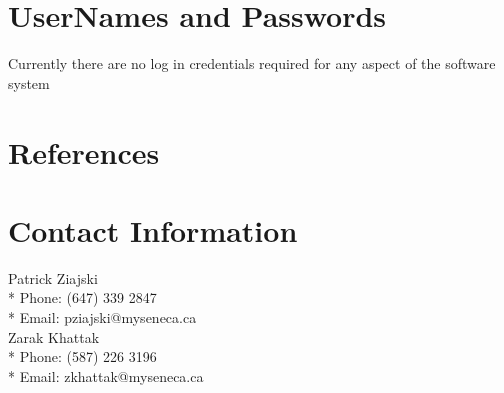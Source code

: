 \documentclass[a4paper,12pt]{article}
\begin{document}
\newpage
\section{UserNames and Passwords}
Currently there are no log in credentials required for any aspect of the software system

\newpage
\section{References}

\newpage
\section{Contact Information}
\begin{center}
    Patrick Ziajski \\*
    Phone: (647) 339 2847 \\*
    Email: pziajski@myseneca.ca \\
    \vspace{5mm}
    Zarak Khattak \\*
    Phone: (587) 226 3196\\*
    Email: zkhattak@myseneca.ca
\end{center}

\end{document}
